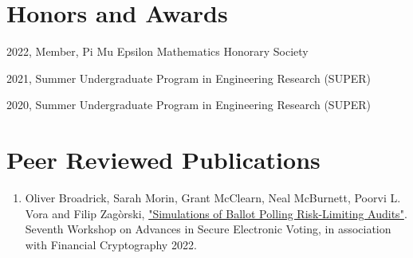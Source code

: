 \documentclass[letterpaper]{article}
\renewenvironment{itemize}{
  \begin{list}{}{
    \setlength{\leftmargin}{1.5em}
  }
}{
  \end{list}
}
\begin{document}
\section*{Honors and Awards}

\begin{itemize}
\item 2022, Member, Pi Mu Epsilon Mathematics Honorary Society
\item 2021, Summer Undergraduate Program in Engineering Research (SUPER)
\item 2020, Summer Undergraduate Program in Engineering Research (SUPER)
\end{itemize}


\section*{Peer Reviewed Publications}

\begin{enumerate}

\item Oliver Broadrick, Sarah Morin, Grant McClearn, Neal McBurnett, Poorvi L. Vora and Filip Zag\`{o}rski, \href{https://oliverbroadrick.com/papers/simulations-of-ballot-polling-rlas.pdf}{"Simulations of Ballot Polling Risk-Limiting Audits"}. Seventh Workshop on Advances in Secure Electronic Voting, in association with Financial Cryptography 2022.

\end{enumerate}

\bigskip
\end{document}
